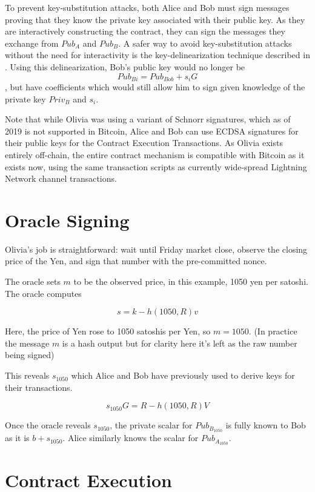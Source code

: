 \documentclass[10pt]{article}
\begin{document}
To prevent key-substitution attacks, both Alice and Bob must sign messages proving that they know the private key associated with their public key.  As they are interactively constructing the contract, they can sign the messages they exchange from \(Pub_A\) and \(Pub_B\).  A safer way to avoid key-substitution attacks without the need for interactivity is the key-delinearization technique described in  \cite{cryptoeprint:2018:068}.  Using this delinearization, Bob's public key would no longer be \[Pub_{Bi} = Pub_{Bob} + s_iG\], but have coefficients which would still allow him to sign given knowledge of the private key \(Priv_B\) and \(s_i\).


Note that while Olivia was using a variant of Schnorr signatures, which as of 2019 is not supported in Bitcoin, Alice and Bob can use ECDSA signatures for their public keys for the Contract Execution Transactions.  As Olivia exists entirely off-chain, the entire contract mechanism is compatible with Bitcoin as it exists now, using the same transaction scripts as currently wide-spread Lightning Network channel transactions.

\section*{Oracle Signing}

Olivia's job is straightforward: wait until Friday market close, observe the closing price of the Yen, and sign that number with the pre-committed nonce.

The oracle sets \(m\) to be the observed price, in this example, 1050 yen per satoshi.  The oracle computes

\[s = k - h(1050, R)v\]

Here, the price of Yen rose to 1050 satoshis per Yen, so \(m = 1050\).  (In practice the message \(m\) is a hash output but for clarity here it's left as the raw number being signed)


This reveals \(s_{1050}\) which Alice and Bob have previously used to derive keys for their transactions.

\[s_{1050}G = R - h(1050, R)V\]

Once the oracle reveals \(s_{1050}\), the private scalar for \(Pub_{B_{1050}}\) is fully known to Bob as it is \(b + s_{1050}\).  Alice similarly knows the scalar for \(Pub_{A_{1050}}\). 

\section*{Contract Execution}
\end{document}
